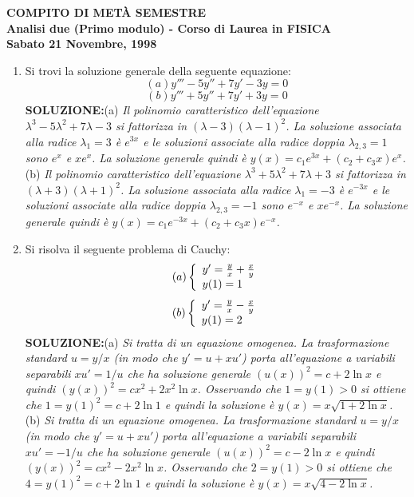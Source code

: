\documentclass[12pt,a4paper]{report}\pagenumbering{roman}
\begin{document}
\begin{center}
{\bf COMPITO DI MET\`A SEMESTRE}\\
{\bf Analisi due (Primo modulo) - Corso di Laurea in FISICA}\\
{\bf Sabato 21 Novembre, 1998}
\end{center}
\begin{enumerate}
\item Si trovi la soluzione generale della seguente equazione:
$$(a) y'''-5y''+7y'-3y=0$$
$$(b) y'''+5y''+7y'+3y=0$$
{\bf SOLUZIONE:}(a) {\it Il polinomio caratteristico dell'equazione 
$\lambda^3-5\lambda^2+7\lambda-3$
si fattorizza in $(\lambda-3)(\lambda-1)^2$. 
La soluzione associata alla radice $\lambda_1=3$ \`e $e^{3x}$ e le soluzioni
associate alla radice doppia $\lambda_{2,3}=1$  sono $e^x$ e $xe^x$. La soluzione 
generale quindi \`e $y(x)=c_1e^{3x}+(c_2+c_3x)e^x$.}\\
(b) {\it Il polinomio caratteristico dell'equazione 
$\lambda^3+5\lambda^2+7\lambda+3$
si fattorizza in $(\lambda+3)(\lambda+1)^2$. 
La soluzione associata alla radice $\lambda_1=-3$ \`e $e^{-3x}$ e le soluzioni
associate alla radice doppia $\lambda_{2,3}=-1$ sono $e^{-x}$ e 
$xe^{-x}$. La soluzione 
generale quindi \`e $y(x)=c_1e^{-3x}+(c_2+c_3x)e^{-x}$.}

\item Si risolva il seguente problema di Cauchy:
$$(a)\left\{\begin{array}{l} y'={y\over x}+{x\over y} \\ y(1)=1\end{array}\right.$$
$$(b)\left\{\begin{array}{l} y'={y\over x}-{x\over y} \\ y(1)=2\end{array}\right.$$
{\bf SOLUZIONE:}(a) {\it Si tratta di un equazione omogenea. La trasformazione standard $u=y/x$
(in modo che $y'=u+xu'$) porta all'equazione a variabili separabili $xu'=1/u$ che ha 
soluzione generale $(u(x))^2=c+2\ln x$ e quindi $(y(x))^2=cx^2+2x^2\ln x$. Osservando
che $1=y(1)>0$ si ottiene che $1=y(1)^2=c+2\ln 1$ e quindi la soluzione \`e $y(x)=
x\sqrt{1+2\ln x}$.}\\
(b) {\it Si tratta di un equazione omogenea. La trasformazione standard $u=y/x$
(in modo che $y'=u+xu'$) porta all'equazione a variabili separabili $xu'=-1/u$ che ha 
soluzione generale $(u(x))^2=c-2\ln x$ e quindi $(y(x))^2=cx^2-2x^2\ln x$. Osservando
che $2=y(1)>0$ si ottiene che $4=y(1)^2=c+2\ln 1$ e quindi la soluzione \`e $y(x)=
x\sqrt{4-2\ln x}$.}



\end{enumerate}
\end{document}
